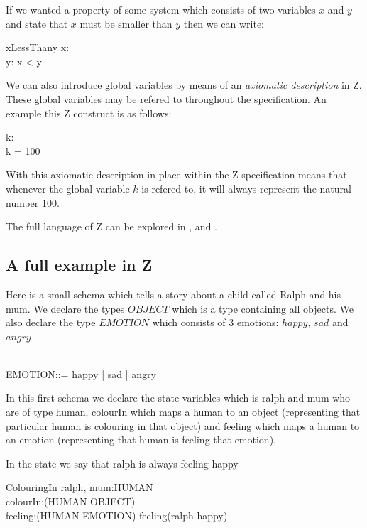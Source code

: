 If we wanted a property of some system which consists of two variables $x$ and $y$ and state that $x$ must be smaller than $y$ then we can write:

\begin{schema}{xLessThany}
x: \nat \\
y: \nat
\where
x < y
\end{schema}

We can also introduce global variables by means of an \textit{axiomatic description} in Z. These global variables may be refered to throughout the specification. An example this Z construct is as follows:

\begin{axdef}
k: \nat \\
\where
k = 100
\end{axdef}

With this axiomatic description in place within the Z specification means that whenever the global variable $k$ is refered to, it will always represent the natural number 100.

The full language of Z can be explored in \cite{spiveyreferencemanual}, \cite{essenceofz} and \cite{Woodcock:1996:UZS:235337}.

\subsection{A full example in Z}
Here is a small schema which tells a story about a child called Ralph and his mum. We declare the types $OBJECT$ which is a type containing all objects. We also declare the type $EMOTION$ which consists of 3 emotions: $happy$, $sad$ and $angry$

\begin{zed}
[OBJECT] \\
EMOTION::= happy | sad | angry
\end{zed}

In this first schema we declare the state variables which is ralph and mum who are of type human, colourIn which maps a human to an object (representing that particular human is colouring in that object) and feeling which maps a human to an emotion (representing that human is feeling that emotion).

In the state we say that ralph is always feeling happy
\begin{schema}{ColouringIn}
ralph, mum:HUMAN \\
colourIn:(HUMAN \pfun OBJECT) \\
feeling:(HUMAN \pfun EMOTION)
\where
feeling(ralph \mapsto happy)
\end{schema}

